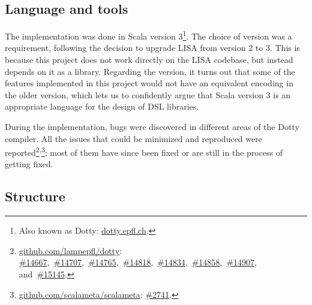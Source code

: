 \subsection{Language and tools}

The implementation was done in Scala version 3\footnote{Also known as Dotty: \href{https://dotty.epfl.ch}{dotty.epfl.ch}.}. The choice of version was a requirement, following the decision to upgrade LISA from version 2 to 3. This is because this project does not work directly on the LISA codebase, but instead depends on it as a library. Regarding the version, it turns out that some of the features implemented in this project would not have an equivalent encoding in the older version, which lets us to confidently argue that Scala version 3 is an appropriate language for the design of DSL libraries.

During the implementation, bugs were discovered in different areas of the Dotty compiler. All the issues that could be minimized and reproduced were reported\footnote{
\href{https://github.com/lampepfl/dotty}{github.com/lampepfl/dotty}:
\href{https://github.com/lampepfl/dotty/issues/14667}{\#14667},\
\href{https://github.com/lampepfl/dotty/issues/14707}{\#14707},\
\href{https://github.com/lampepfl/dotty/issues/14765}{\#14765},\
\href{https://github.com/lampepfl/dotty/issues/14818}{\#14818},\
\href{https://github.com/lampepfl/dotty/issues/14834}{\#14834},\
\href{https://github.com/lampepfl/dotty/issues/14858}{\#14858},\
\href{https://github.com/lampepfl/dotty/issues/14907}{\#14907}, and\
\href{https://github.com/lampepfl/dotty/issues/15145}{\#15145}.
}\textsuperscript{,}\footnote{
\href{https://github.com/scalameta/scalameta}{github.com/scalameta/scalameta}:
\href{https://github.com/scalameta/scalameta/issues/2741}{\#2741}.
}; most of them have since been fixed or are still in the process of getting fixed.

\subsection{Structure}

